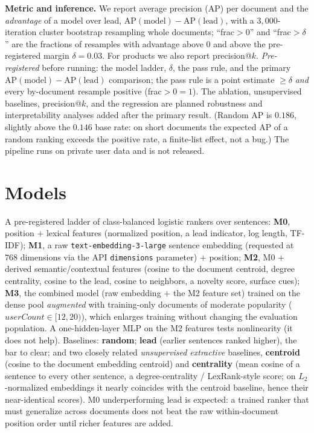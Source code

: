 \documentclass[11pt]{article}
\begin{document}
\textbf{Metric and inference.} We report average precision (AP) per document and the
\emph{advantage} of a model over lead, $\mathrm{AP}(\text{model})-\mathrm{AP}(\text{lead})$, with
a $3{,}000$-iteration cluster bootstrap resampling whole documents; ``frac${>}0$'' and
``frac${>}\delta$'' are the fractions of resamples with advantage above $0$ and above the
pre-registered margin $\delta{=}0.03$. For products we also report precision@$k$.
\emph{Pre-registered} before running: the model ladder, $\delta$, the pass rule, and the primary
$\mathrm{AP}(\text{model})-\mathrm{AP}(\text{lead})$ comparison; the pass rule is a point estimate
$\geq \delta$ \emph{and} every by-document resample positive (frac${>}0=1$). The ablation,
unsupervised baselines, precision@$k$, and the regression are planned robustness and
interpretability analyses added after the primary result. (Random AP is $0.186$, slightly above
the $0.146$ base rate: on short documents the expected AP of a random ranking exceeds the
positive rate, a finite-list effect, not a bug.) The pipeline runs on private user data and is
not released.

\section{Models}
A pre-registered ladder of class-balanced logistic rankers over sentences:
\textbf{M0}, position $+$ lexical features (normalized position, a lead indicator, log length,
TF-IDF); \textbf{M1}, a raw \texttt{text-embedding-3-large} sentence embedding (requested at
$768$ dimensions via the API \texttt{dimensions} parameter) $+$ position; \textbf{M2}, M0 $+$ derived semantic/contextual features (cosine to the document
centroid, degree centrality, cosine to the lead, cosine to neighbors, a novelty score, surface
cues); \textbf{M3}, the combined model (raw embedding $+$ the M2 feature set) trained on the
dense pool \emph{augmented} with training-only documents of moderate popularity
($\textit{userCount}\in[12,20)$), which enlarges training without changing the evaluation
population. A one-hidden-layer MLP on the M2 features tests nonlinearity (it does not help).
Baselines: \textbf{random}; \textbf{lead} (earlier sentences ranked higher), the bar to clear;
and two closely related \emph{unsupervised extractive} baselines, \textbf{centroid} (cosine to
the document embedding centroid) and \textbf{centrality} (mean cosine of a sentence to every
other sentence, a
degree-centrality / LexRank-style score; on $L_2$-normalized embeddings it nearly coincides with
the centroid baseline, hence their near-identical scores). M0 underperforming lead is expected: a
trained ranker that must generalize across documents does not beat the raw within-document
position order until richer features are added.
\end{document}
